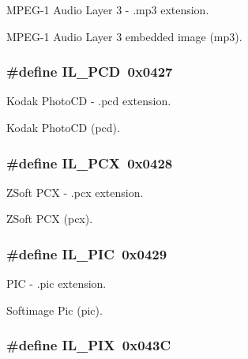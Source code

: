 M\+P\+E\+G-\/1 Audio Layer 3 -\/ .mp3 extension. 

M\+P\+E\+G-\/1 Audio Layer 3 embedded image (mp3). \hypertarget{group__il__formats_gabbf7912521d845cc4d4a476153809f5e}{
\subsubsection[{I\+L\+\_\+\+P\+C\+D}]{\setlength{\rightskip}{0pt plus 5cm}\#define I\+L\+\_\+\+P\+C\+D~0x0427}}\label{group__il__formats_gabbf7912521d845cc4d4a476153809f5e}


Kodak Photo\+C\+D -\/ .pcd extension. 

Kodak Photo\+C\+D (pcd). \hypertarget{group__il__formats_gafc747ca51da8a4f321007eabba5889cb}{
\subsubsection[{I\+L\+\_\+\+P\+C\+X}]{\setlength{\rightskip}{0pt plus 5cm}\#define I\+L\+\_\+\+P\+C\+X~0x0428}}\label{group__il__formats_gafc747ca51da8a4f321007eabba5889cb}


Z\+Soft P\+C\+X -\/ .pcx extension. 

Z\+Soft P\+C\+X (pcx). \hypertarget{group__il__formats_ga81e844eda589791e15672d7720c030c3}{
\subsubsection[{I\+L\+\_\+\+P\+I\+C}]{\setlength{\rightskip}{0pt plus 5cm}\#define I\+L\+\_\+\+P\+I\+C~0x0429}}\label{group__il__formats_ga81e844eda589791e15672d7720c030c3}


P\+I\+C -\/ .pic extension. 

Softimage Pic (pic). \hypertarget{group__il__formats_ga0f54e0e125c677295924a60b1c1a69cb}{
\subsubsection[{I\+L\+\_\+\+P\+I\+X}]{\setlength{\rightskip}{0pt plus 5cm}\#define I\+L\+\_\+\+P\+I\+X~0x043\+C}}\label{group__il__formats_ga0f54e0e125c677295924a60b1c1a69cb}


